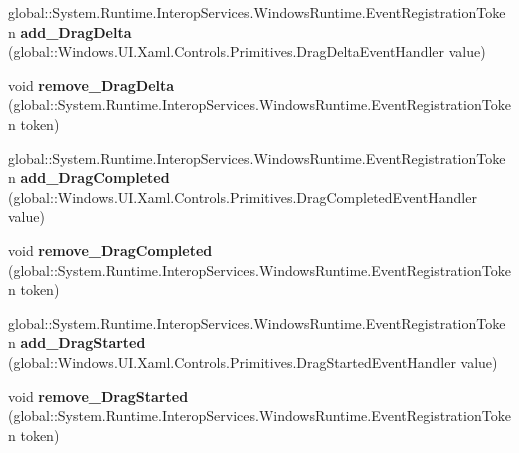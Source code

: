 \begin{DoxyCompactItemize}
global\+::\+System.\+Runtime.\+Interop\+Services.\+Windows\+Runtime.\+Event\+Registration\+Token {\bfseries add\+\_\+\+Drag\+Delta} (global\+::\+Windows.\+U\+I.\+Xaml.\+Controls.\+Primitives.\+Drag\+Delta\+Event\+Handler value)
\item 
\mbox{\label{interface_windows_1_1_u_i_1_1_xaml_1_1_controls_1_1_primitives_1_1_i_thumb_a7f2e0d4f77e1da383618536040a32d00}} 
void {\bfseries remove\+\_\+\+Drag\+Delta} (global\+::\+System.\+Runtime.\+Interop\+Services.\+Windows\+Runtime.\+Event\+Registration\+Token token)
\item 
\mbox{\label{interface_windows_1_1_u_i_1_1_xaml_1_1_controls_1_1_primitives_1_1_i_thumb_ad9d99e0f3518ed7231b6226b63c2d3e9}} 
global\+::\+System.\+Runtime.\+Interop\+Services.\+Windows\+Runtime.\+Event\+Registration\+Token {\bfseries add\+\_\+\+Drag\+Completed} (global\+::\+Windows.\+U\+I.\+Xaml.\+Controls.\+Primitives.\+Drag\+Completed\+Event\+Handler value)
\item 
\mbox{\label{interface_windows_1_1_u_i_1_1_xaml_1_1_controls_1_1_primitives_1_1_i_thumb_a9c342427ff81fa677a36391138856518}} 
void {\bfseries remove\+\_\+\+Drag\+Completed} (global\+::\+System.\+Runtime.\+Interop\+Services.\+Windows\+Runtime.\+Event\+Registration\+Token token)
\item 
\mbox{\label{interface_windows_1_1_u_i_1_1_xaml_1_1_controls_1_1_primitives_1_1_i_thumb_af16d7fcdb997b8237d826597ee4dfdf9}} 
global\+::\+System.\+Runtime.\+Interop\+Services.\+Windows\+Runtime.\+Event\+Registration\+Token {\bfseries add\+\_\+\+Drag\+Started} (global\+::\+Windows.\+U\+I.\+Xaml.\+Controls.\+Primitives.\+Drag\+Started\+Event\+Handler value)
\item 
\mbox{\label{interface_windows_1_1_u_i_1_1_xaml_1_1_controls_1_1_primitives_1_1_i_thumb_a160f1c382efe8c910b223fd4ae316948}} 
void {\bfseries remove\+\_\+\+Drag\+Started} (global\+::\+System.\+Runtime.\+Interop\+Services.\+Windows\+Runtime.\+Event\+Registration\+Token token)

\end{DoxyCompactItemize}
